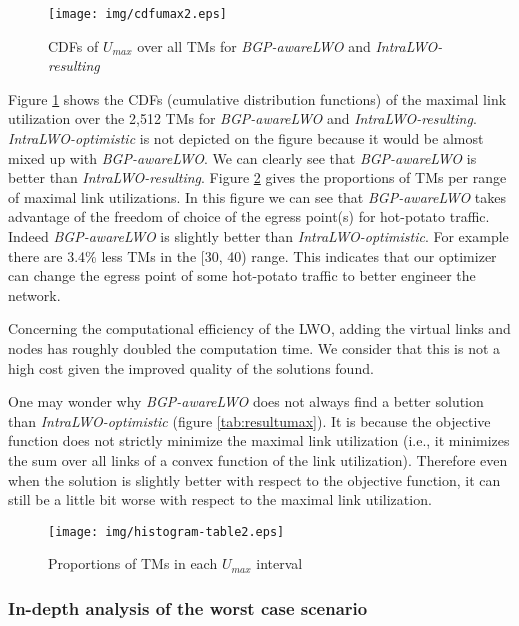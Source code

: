 \documentclass{acm_proc_article-sp}
\begin{document}
\begin{figure}[htbp]
  \centering
  \texttt{[image: img/cdfumax2.eps]}
  \caption{CDFs of $U_{max}$ over all TMs  for \textit{BGP-awareLWO} and \textit{IntraLWO-resulting}}
  \label{fig:umax}
\end{figure}


Figure \ref{fig:umax} shows the CDFs (cumulative distribution functions) of the maximal link utilization over the 2,512 TMs
for \textit{BGP-awareLWO} and
\textit{IntraLWO-resulting}. \textit{IntraLWO-optimistic} is not
depicted on the figure because it would be almost mixed up with \textit{BGP-awareLWO}.
We can clearly see 
that \textit{BGP-awareLWO} is better than \textit{IntraLWO-resulting}. 
Figure \ref{tab:resultumax2} gives the proportions of TMs per range of maximal link utilizations.
In this figure we can see that \textit{BGP-awareLWO} takes advantage of
the freedom of choice of the egress point(s) for hot-potato traffic. Indeed 
\textit{BGP-awareLWO} is slightly better than \textit{IntraLWO-optimistic}.
For example there are 3.4\% less TMs in the [30, 40)
range. This indicates that our optimizer can 
change the egress point of some hot-potato traffic to better engineer
the network. 

Concerning the computational efficiency of the LWO,
adding the virtual links and nodes has roughly doubled the computation
time. We consider that this is not a high cost given the improved quality
of the solutions found.

One may wonder why \textit{BGP-awareLWO} does not always find a
better solution than \textit{IntraLWO-optimistic} (figure  
\ref{tab:resultumax}). It is because the objective
function does not strictly minimize the maximal link utilization 
(i.e., it minimizes the sum over all links of a convex function of the link utilization). 
Therefore even when the solution is slightly better with respect to the objective
function, it can still be a little bit worse with respect to the maximal link utilization.


\begin{figure}[htbp]
  \centering
  \texttt{[image: img/histogram-table2.eps]}
  \caption{Proportions of TMs in each $U_{max}$ interval}
  \label{tab:resultumax2}
\end{figure}


\subsubsection{In-depth analysis of the worst case scenario}
\end{document}
